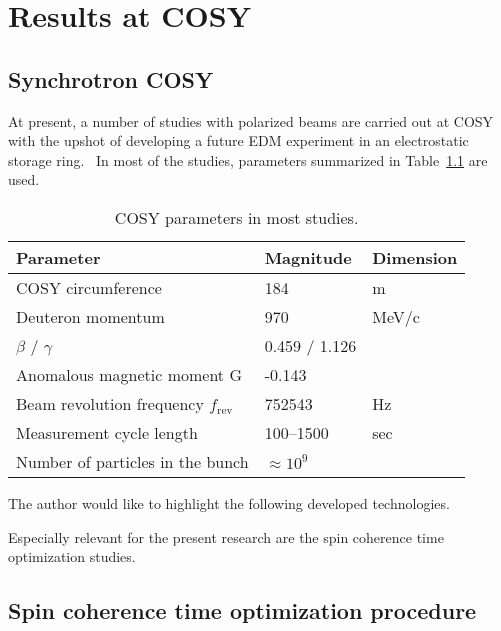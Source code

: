 \chapter{Results at COSY}\label{chpt4:top-level}

\section{Synchrotron COSY}


At present, a number of studies with polarized beams are carried out at COSY with the upshot of 
developing a future EDM experiment in an electrostatic storage ring.~\cite{Lehrach:Precursor2012, Lehrach:IPAC15, COSY:SpinTuneMapping, Eversmann:SpinTuneMeasurement, COSY:SCT:1000sec, Wagner:BBA2018}
In most of the studies, parameters summarized in Table~\ref{tbl:COSY-studies} are used.

\begin{table}[h]\centering
	\caption{COSY parameters in most studies.\label{tbl:COSY-studies}}
	\begin{tabular}{lll}
		\hline
		Parameter & Magnitude & Dimension \\
		\hline
		COSY circumference & 184 & m\\
		Deuteron momentum & 970 & MeV/c \\
		 $\beta$ / $\gamma$ & 0.459 / 1.126 & \\
		 Anomalous magnetic moment G& -0.143& \\
		 Beam revolution frequency $f_{\mathrm{rev}}$& 752543& Hz\\
		 Measurement cycle length& 100--1500& sec\\
		 Number of particles in the bunch & $\approx 10^9$& \\
		 \hline
	\end{tabular}
\end{table}

The author would like to highlight the following developed technologies.


Especially relevant for the present research are the spin coherence time optimization studies.
\section{Spin coherence time optimization procedure}\label{sec:COSY:SCT-optimization}



\clearpage
